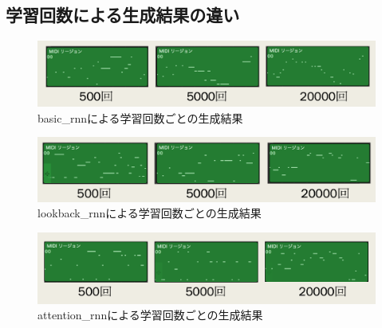 \subsection{学習回数による生成結果の違い}
\begin{figure}[h]
    \begin{screen}
    \begin{center}
        \includegraphics[scale=0.68, clip]{./img/basicMIDI.png}
        \caption{basic\_rnnによる学習回数ごとの生成結果}
        \label{fig:basic_rnnによる学習回数ごとの生成結果}
    \end{center}
    \end{screen}
\end{figure}
\begin{figure}[h]
    \begin{screen}
    \begin{center}
        \includegraphics[scale=0.68, clip]{./img/lookbackMIDI.png}
        \caption{lookback\_rnnによる学習回数ごとの生成結果}
        \label{fig:lookback_rnnによる学習回数ごとの生成結果}
    \end{center}
    \end{screen}
\end{figure}
\begin{figure}[h]
    \begin{screen}
    \begin{center}
        \includegraphics[scale=0.68, clip]{./img/attentionMIDI.png}
        \caption{attention\_rnnによる学習回数ごとの生成結果}
        \label{fig:attention_rnnによる学習回数ごとの生成結果}
    \end{center}
    \end{screen}
\end{figure}
\newpage
